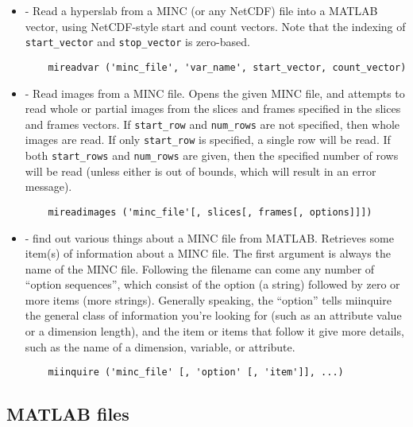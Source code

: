 \begin{itemize}

\item {} - Read a hyperslab from a MINC (or any NetCDF)
file into a MATLAB vector, using NetCDF-style start and count
vectors.  Note that the indexing of \verb|start_vector| and
\verb|stop_vector| is zero-based.
\begin{verbatim}
    mireadvar ('minc_file', 'var_name', start_vector, count_vector)
\end{verbatim}

\item {} - Read images from a MINC file.  Opens the
given MINC file, and attempts to read whole or partial images from the
slices and frames specified in the slices and frames vectors.  If
\verb|start_row| and \verb|num_rows| are not specified, then whole
images are read.  If only \verb|start_row| is specified, a single row
will be read.  If both \verb|start_rows| and \verb|num_rows| are
given, then the specified number of rows will be read (unless either
is out of bounds, which will result in an error message).

\begin{verbatim}
    mireadimages ('minc_file'[, slices[, frames[, options]]]) 
\end{verbatim}

\item {} - find out various things about a MINC file
from MATLAB.  Retrieves some item(s) of information about a MINC file.
The first argument is always the name of the MINC file.  Following the
filename can come any number of ``option sequences'', which consist of
the option (a string) followed by zero or more items (more strings).
Generally speaking, the ``option'' tells miinquire the general class
of information you're looking for (such as an attribute value or a
dimension length), and the item or items that follow it give
 more details, such as the name of a dimension,
variable, or attribute.

\begin{verbatim}
    miinquire ('minc_file' [, 'option' [, 'item']], ...)
\end{verbatim}

\end{itemize}

\newpage
\subsection{MATLAB files}
\label{emma_reference}





